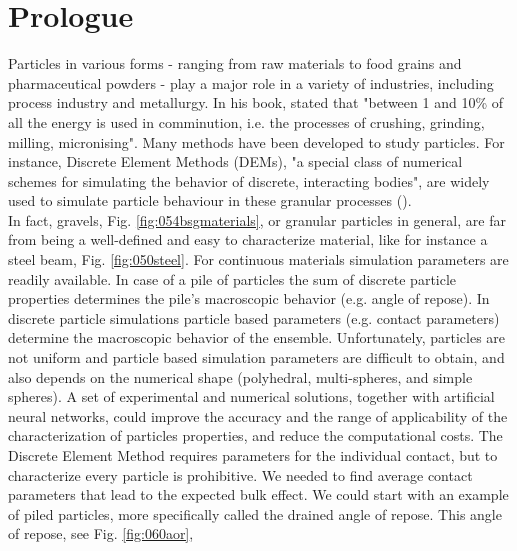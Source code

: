 
\chapter{Prologue}
\label{cap:prologue}

Particles in various forms - ranging from raw materials to food grains and pharmaceutical powders - 
play a major role in a variety of industries, including process industry and metallurgy. 
In his book, \citet{RefWorks:117} stated that "between 1 and 10\% of all the energy is used in 
comminution, i.e. the processes of crushing, grinding, milling, micronising". 
Many methods have been developed to study particles.
For instance, Discrete Element Methods (\acs{DEMs}), "a special class of numerical
schemes for simulating the behavior of discrete, interacting bodies", are widely used to 
simulate particle behaviour in these granular processes
(\citet{RefWorks:130}).\\ 


In fact, gravels, Fig. \ref{fig:054bsgmaterials}, or granular particles in
general, are far from being a well-defined and easy to characterize material,
like for instance a steel beam, Fig.
\ref{fig:050steel}. For continuous materials simulation
parameters are readily available.
In case of a pile of particles the sum of discrete particle properties determines the pile's macroscopic behavior 
(e.g. angle of repose).
In discrete particle simulations particle based parameters (e.g. contact parameters) determine the macroscopic behavior 
of the ensemble.
Unfortunately, particles are not uniform and particle based simulation
parameters are difficult to obtain, and also depends on the numerical shape
(polyhedral, multi-spheres, and simple spheres).
A set of experimental and numerical solutions, together with artificial neural
networks, could improve the accuracy and the range of applicability of the
characterization of particles properties, and reduce the computational costs.
The Discrete Element Method requires parameters for the individual contact, but
to characterize every particle is prohibitive.
We needed to find average contact parameters that lead to the expected bulk
effect.
We could start with an example of piled particles, more specifically called the
drained angle of repose. This angle of repose, see Fig. \ref{fig:060aor},

